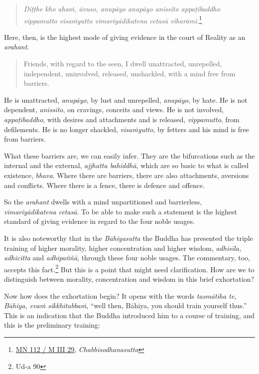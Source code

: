 \begin{quote}
\emph{Diṭṭhe kho ahaṁ, āvuso, anupāyo anapāyo anissito appaṭibaddho vippamutto visaṁyutto vimariyādikatena cetasā viharāmi.}\footnote{\href{https://suttacentral.net/mn112/pli/ms}{MN 112 / M III 29}, \emph{Chabbisodhanasutta}}
\end{quote}

Here, then, is the highest mode of giving evidence in the court of Reality as an \emph{arahant}.

\begin{quote}
Friends, with regard to the seen, I dwell unattracted, unrepelled, independent, uninvolved, released, unshackled, with a mind free from barriers.
\end{quote}

He is unattracted, \emph{anupāyo}, by lust and unrepelled, \emph{anapāyo}, by hate. He is not dependent, \emph{anissito}, on cravings, conceits and views. He is not involved, \emph{appaṭibaddho}, with desires and attachments and is released, \emph{vippamutto}, from defilements. He is no longer shackled, \emph{visaṁyutto}, by fetters and his mind is free from barriers.

What these barriers are, we can easily infer. They are the bifurcations such as the internal and the external, \emph{ajjhatta bahiddhā}, which are so basic to what is called existence, \emph{bhava}. Where there are barriers, there are also attachments, aversions and conflicts. Where there is a fence, there is defence and offence.

So the \emph{arahant} dwells with a mind unpartitioned and barrierless, \emph{vimariyādikatena cetasā}. To be able to make such a statement is the highest standard of giving evidence in regard to the four noble usages.

It is also noteworthy that in the \emph{Bāhiyasutta} the Buddha has presented the triple training of higher morality, higher concentration and higher wisdom, \emph{adhisīla, adhicitta} and \emph{adhipaññā}, through these four noble usages. The commentary, too, accepts this fact.\footnote{Ud-a 90} But this is a point that might need clarification. How are we to distinguish between morality, concentration and wisdom in this brief exhortation?

Now how does the exhortation begin? It opens with the words \emph{tasmātiha te, Bāhiya, evaṁ sikkhitabbaṁ}, ``well then, Bāhiya, you should train yourself thus.'' This is an indication that the Buddha introduced him to a course of training, and this is the preliminary training:

